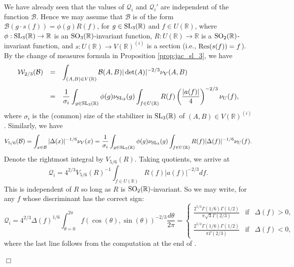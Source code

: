 \documentclass{article}
\def\SL{{\rm SL}}
\def\SO{{\rm SO}}
\def\Res{{\rm Res}}
\def\R{{\mathbb R}}
\def\cB{{\mathcal B}}
\def\W{{\mathcal W}}
\newenvironment{proof}{\noindent {\bf Proof:}}{$\Box$ \vspace{2 ex}}
\begin{document}
\begin{proof}
We have already seen that the values of $\mathcal Q_i$ and $\mathcal Q_i'$ are independent of the function $\cB$. Hence we may assume that $\cB$ is of the form $\cB(g\cdot s(f))=\phi(g)R(f)$, for $g\in\SL_3(\R)$ and $f\in U(\R)$, where $\phi:\SL_3(\R)\to\R$ is an $\SO_3(\R)$-invariant function, $R:U(\R)\to\R$ is a $\SO_2(\R)$-invariant function, and $s:U(\R)\to V(\R)^{(i)}$ is a section (i.e., $\Res(s(f))=f$). By the change of measures formula in Proposition \ref{prop:jac_sl_3}, we have
\begin{equation*}
\begin{array}{rcl}
\W_{2/3}(\cB)&=&\displaystyle\int_{(A,B)\in V(\R)}\cB(A,B)|\det(A)|^{-2/3}\nu_V(A,B)
\\[.2in]
&=&\displaystyle\frac1{\sigma_i}
\int_{g\in\SL_3(\R)}\phi(g)\nu_{\SL_3}(g)\int_{f\in U(\R)}R(f)\left(\frac{|a(f)|}{4}\right)^{-2/3}\nu_U(f),
\end{array}
\end{equation*}
where $\sigma_i$ is the (common) size of the stabilizer in $\SL_3(\R)$ of $(A,B)\in V(\R)^{(i)}$.
Similarly, we have
\begin{equation*}
V_{5/6}(\cB)=\int_{x\in\cB}|\Delta(x)|^{-1/6}\nu_V(x) = \frac1{\sigma_i}\int_{g\in\SL_3(\R)}\phi(g)\nu_{\SL_3}(g)\int_{f\in U(\R)}R(f)|\Delta(f)|^{-1/6}\nu_U(f).
\end{equation*}
Denote the rightmost integral by $V_{5/6}(R)$.
Taking quotients, we arrive at
$$\mathcal Q_i=4^{2/3}V_{5/6}(R)^{-1}\displaystyle\int_{f\in U(\R)}R(f)|a(f)|^{-2/3}df.$$
This is independent of $R$ so long as $R$ is $\SO_2(\R)$-invariant. So we may write, for any $f$ whose discriminant has the correct sign:
\begin{equation*}
\mathcal Q_i
=4^{2/3}\Delta(f)^{1/6}\displaystyle\int_{\theta=0}^{2\pi}f(\cos(\theta),\sin(\theta))^{-2/3}\frac{d\theta}{2\pi}
=\displaystyle
\left\{
\begin{array}{rcl}
\displaystyle\frac{2^{5/3}\Gamma(1/6)\Gamma(1/2)}{\pi\sqrt{3}\Gamma(2/3)}&\mbox{if} &\Delta(f)>0,
\\[.1in]
\displaystyle\frac{2^{5/3}\Gamma(1/6)\Gamma(1/2)}{\pi\Gamma(2/3)}&\mbox{if}&
\Delta(f)<0,
\end{array}
\right.
\end{equation*}
where the last line follows from the computation at the end of \cite[\S6.1]{BST}.


\end{proof}
\end{document}
